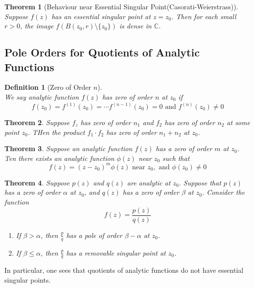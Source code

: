 \documentclass[12pt]{article}
\newtheorem{definition}{Definition}[section]
\newtheorem{theorem}{Theorem}[section]
\theoremstyle{definition}
\begin{document}
\begin{theorem}[Behaviour near Essential Singular Point(Casorati-Weierstrass)]
\hfill\\\normalfont Suppose $f(z)$ has an essential singular point at $z=z_0$. Then for each small $r>0$, the image $f(B(z_0, r)\setminus \{z_0\})$ is dense in $\mathbb{C}$.
\end{theorem}
\subsection{Pole Orders for Quotients of Analytic Functions}
\begin{definition}[Zero of Order {$n$}]
\hfill\\\normalfont We say analytic function $f(z)$ has zero of order $n$ at $z_0$ if
\[
f(z_0) = f^{(1)}(z_0) = \cdots f^{(n-1)}(z_0) = 0 \text{ and } f^{(n)}(z_0) \neq 0
\]
\end{definition}
\begin{theorem}\normalfont Suppose $f_z$ has zero of order $n_1$ and $f_2$ has zero of order $n_2$ at some point $z_0$. THen the product $f_1\cdot f_2$ has zero of order $n_1 + n_2$ at $z_0$.
\end{theorem}
\begin{theorem}\normalfont Suppose an analytic function $f(z)$ has a zero of order $m$ at $z_0$. Ten there exists an analytic function $\phi(z)$ near $z_0$ such that
\[
f(z) =  (z-z_0)^m \phi(z) \text{ near }z_0, \text{ and }\phi(z_0)\neq 0
\]
\end{theorem}
\begin{theorem}\normalfont Suppose $p(z)$ and $q(z)$ are analytic at $z_0$. Suppose that $p(z)$ has a zero of order $\alpha$ at $z_0$, and $q(z)$ has a zero of order $\beta$ at $z_0$. Consider the function
\[
f(z) = \frac{p(z)}{q(z)}
\]
\begin{enumerate}
	\item If $\beta>\alpha$, then $\frac{p}{q}$ has a pole of order $\beta-\alpha$ at $z_0$.
	\item If $\beta \leq \alpha$, then $\frac{p}{q}$ has a removable singular point at $z_0$.
\end{enumerate}
\end{theorem}
In particular, one sees that quotients of analytic functions do not have essential singular points.
\end{document}
